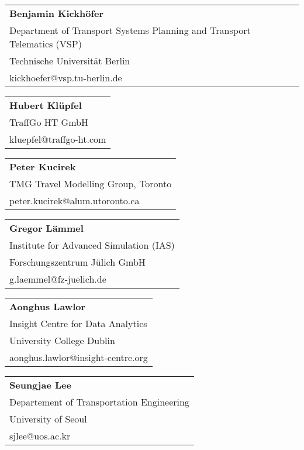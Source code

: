 \begin{tabular}[width=0.48\textwidth]{@{}l}
\textbf{Benjamin Kickhöfer} \\
Department of Transport Systems Planning and Transport Telematics (VSP) \\
Technische Universität Berlin \\
kickhoefer@vsp.tu-berlin.de \\
\end{tabular}

\begin{tabular}[width=0.48\textwidth]{@{}l}
\textbf{Hubert Klüpfel} \\
TraffGo HT GmbH\\
kluepfel@traffgo-ht.com \\
\end{tabular}

\begin{tabular}[width=0.48\textwidth]{@{}l}
\textbf{Peter Kucirek} \\
TMG Travel Modelling Group, Toronto \\
peter.kucirek@alum.utoronto.ca  \\
\end{tabular}

\begin{tabular}[width=0.48\textwidth]{@{}l}
\textbf{Gregor Lämmel} \\
Institute for Advanced Simulation (IAS) \\
Forschungszentrum Jülich GmbH \\
g.laemmel@fz-juelich.de \\
\end{tabular}

\begin{tabular}[width=0.48\textwidth]{@{}l}
\textbf{Aonghus Lawlor} \\
Insight Centre for Data Analytics \\
University College Dublin \\
aonghus.lawlor@insight-centre.org \\
\end{tabular}

\begin{tabular}[width=0.48\textwidth]{@{}l}
\textbf{Seungjae Lee} \\
Departement of Transportation Engineering \\
University of Seoul \\
sjlee@uos.ac.kr \\
\end{tabular}

